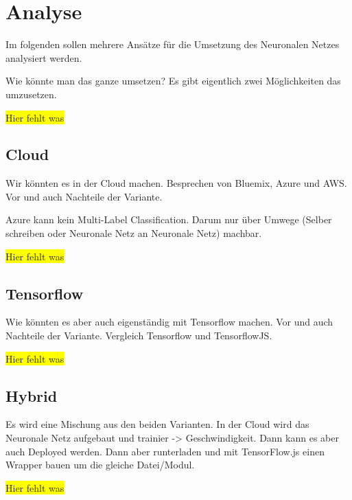 \section{Analyse}
Im folgenden sollen mehrere Ansätze für die Umsetzung des Neuronalen Netzes analysiert werden.

Wie könnte man das ganze umsetzen? Es gibt eigentlich zwei Möglichkeiten das umzusetzen.

\colorbox{yellow}{Hier fehlt was}

\subsection{Cloud}
Wir könnten es in der Cloud machen. Besprechen von Bluemix, Azure und AWS. Vor und auch Nachteile der Variante.

Azure kann kein Multi-Label Classification. Darum nur über Umwege (Selber schreiben oder Neuronale Netz an Neuronale Netz)
machbar.

\colorbox{yellow}{Hier fehlt was}

\subsection{Tensorflow}
Wie könnten es aber auch eigenständig mit Tensorflow machen. Vor und auch Nachteile der Variante. Vergleich Tensorflow
und TensorflowJS.

\colorbox{yellow}{Hier fehlt was}

\subsection{Hybrid}
Es wird eine Mischung aus den beiden Varianten. In der Cloud wird das Neuronale Netz aufgebaut und trainier -> Geschwindigkeit.
Dann kann es aber auch Deployed werden. Dann aber runterladen und mit TensorFlow.js einen Wrapper bauen um die gleiche
Datei/Modul.

\colorbox{yellow}{Hier fehlt was}